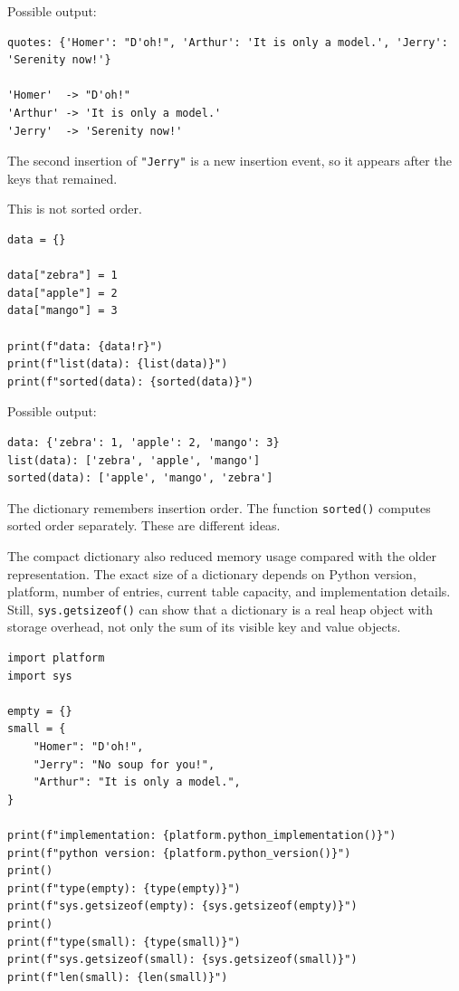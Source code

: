 Possible output:

\begin{verbatim}
quotes: {'Homer': "D'oh!", 'Arthur': 'It is only a model.', 'Jerry': 'Serenity now!'}

'Homer'  -> "D'oh!"
'Arthur' -> 'It is only a model.'
'Jerry'  -> 'Serenity now!'
\end{verbatim}

The second insertion of \texttt{"Jerry"} is a new insertion event, so it appears after the keys that remained.

This is not sorted order.

\begin{verbatim}
data = {}

data["zebra"] = 1
data["apple"] = 2
data["mango"] = 3

print(f"data: {data!r}")
print(f"list(data): {list(data)}")
print(f"sorted(data): {sorted(data)}")
\end{verbatim}

Possible output:

\begin{verbatim}
data: {'zebra': 1, 'apple': 2, 'mango': 3}
list(data): ['zebra', 'apple', 'mango']
sorted(data): ['apple', 'mango', 'zebra']
\end{verbatim}

The dictionary remembers insertion order. The function \texttt{sorted()} computes sorted order separately. These are different ideas.

The compact dictionary also reduced memory usage compared with the older representation. The exact size of a dictionary depends on Python version, platform, number of entries, current table capacity, and implementation details. Still, \texttt{sys.getsizeof()} can show that a dictionary is a real heap object with storage overhead, not only the sum of its visible key and value objects.

\begin{verbatim}
import platform
import sys

empty = {}
small = {
    "Homer": "D'oh!",
    "Jerry": "No soup for you!",
    "Arthur": "It is only a model.",
}

print(f"implementation: {platform.python_implementation()}")
print(f"python version: {platform.python_version()}")
print()
print(f"type(empty): {type(empty)}")
print(f"sys.getsizeof(empty): {sys.getsizeof(empty)}")
print()
print(f"type(small): {type(small)}")
print(f"sys.getsizeof(small): {sys.getsizeof(small)}")
print(f"len(small): {len(small)}")
\end{verbatim}

